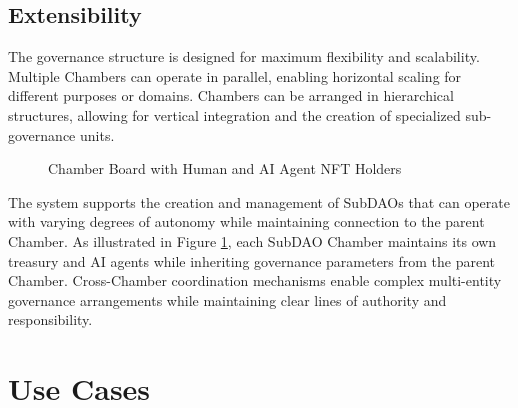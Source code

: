 \documentclass[12pt]{article}
\begin{document}
\subsection{Extensibility}
The governance structure is designed for maximum flexibility and scalability. Multiple Chambers can operate in parallel, enabling horizontal scaling for different purposes or domains. Chambers can be arranged in hierarchical structures, allowing for vertical integration and the creation of specialized sub-governance units.

\begin{figure}[h]
\centering
{}
\caption{Chamber Board with Human and AI Agent NFT Holders}
\label{fig:chamber-hierarchy}
\end{figure}

The system supports the creation and management of SubDAOs that can operate with varying degrees of autonomy while maintaining connection to the parent Chamber. As illustrated in Figure \ref{fig:chamber-hierarchy}, each SubDAO Chamber maintains its own treasury and AI agents while inheriting governance parameters from the parent Chamber. Cross-Chamber coordination mechanisms enable complex multi-entity governance arrangements while maintaining clear lines of authority and responsibility.

\section{Use Cases}
\end{document}
